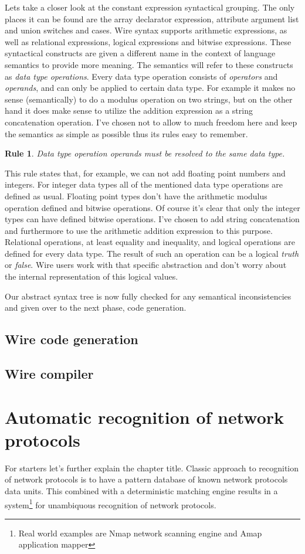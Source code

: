 \documentclass[times, utf8, diplomski]{fer}
\newtheorem{wirerule}{Rule}
\begin{document}
Lets take a closer look at the constant expression syntactical grouping. 
The only places it can be found are the array declarator expression, attribute 
argument list and union switches and cases.
Wire syntax supports arithmetic expressions, as well as relational expressions, 
logical expressions and bitwise expressions. These syntactical constructs are given 
a different name in the context of language semantics to provide more meaning. 
The semantics will refer to these constructs as \emph{data type operations}. 
Every data type operation consists of \emph{operators} and \emph{operands}, 
and can only be applied to certain data type. For example it makes no sense 
(semantically) to do a modulus operation on two strings, but on the other hand 
it does make sense to utilize the addition expression as a string concatenation 
operation.
I've chosen not to allow to much freedom here and keep the semantics as simple 
as possible thus its rules easy to remember.
\begin{wirerule}
Data type operation operands must be resolved to the same data type.
\end{wirerule}
This rule states that, for example, we can not add floating point numbers and integers.
For integer data types all of the mentioned data type operations are defined as usual. 
Floating point types don't have the arithmetic modulus operation defined and 
bitwise operations. Of course it's clear that only the integer types can have 
defined bitwise operations. I've chosen to add string concatenation and furthermore 
to use the arithmetic addition expression to this purpose.
Relational operations, at least equality and inequality, and logical operations
are defined for every data type. The result of such an operation can be a 
logical \emph{truth} or \emph{false}. Wire users work with that specific abstraction 
and don't worry about the internal representation of this logical values.

Our abstract syntax tree is now fully checked for any semantical inconsistencies 
and given over to the next phase, code generation.

\section{Wire code generation}
\section{Wire compiler}

\chapter{Automatic recognition of network protocols}
For starters let's further explain the chapter title. Classic approach to 
recognition of network protocols is to have a pattern database of 
known network protocols data units. This combined with a deterministic matching 
engine results in a system\footnote{Real world examples are Nmap network scanning
engine and Amap application mapper} for unambiquous recognition of network protocols.
\end{document}
